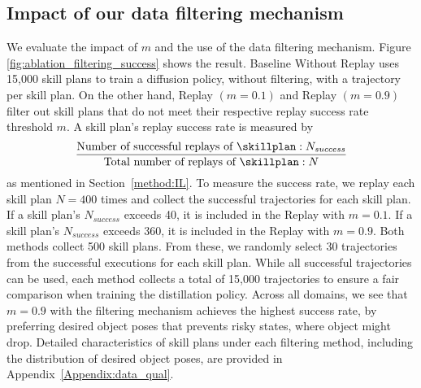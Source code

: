 
\subsection{Impact of our data filtering mechanism}


We evaluate the impact of $m$ and the use of the data filtering mechanism. Figure \ref{fig:ablation_filtering_success} shows the result. Baseline Without Replay uses 15,000 skill plans to train a diffusion policy, without filtering, with a trajectory per skill plan. On the other hand, Replay $(m=0.1)$ and Replay $(m=0.9)$ filter out skill plans that do not meet their respective replay success rate threshold $m$. A skill plan's replay success rate is measured by
\[
\frac{\text{Number of successful replays of }\skillplan: N_{success}}{\text{Total number of replays of }\skillplan: N}
\]
as mentioned in Section~\ref{method:IL}. To measure the success rate, we replay each skill plan \( N = 400 \) times and collect the successful trajectories for each skill plan. If a skill plan's \( N_{success} \) exceeds 40, it is included in the Replay with \( m = 0.1 \). If a skill plan's \( N_{success} \) exceeds 360, it is included in the Replay with \( m = 0.9 \). Both methods collect 500 skill plans. From these, we randomly select 30 trajectories from the successful executions for each skill plan. While all successful trajectories can be used, each method collects a total of 15,000 trajectories to ensure a fair comparison when training the distillation policy. Across all domains, we see that $m=0.9$ with the filtering mechanism achieves the highest success rate, by preferring desired object poses that prevents risky states, where object might drop. Detailed characteristics of skill plans under each filtering method, including the distribution of desired object poses, are provided in Appendix~\ref{Appendix:data_qual}.

